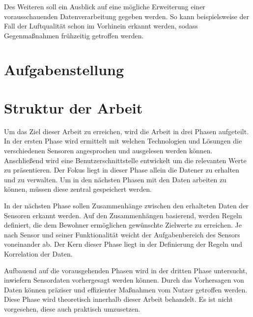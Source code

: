 Des Weiteren soll ein Ausblick auf eine mögliche Erweiterung einer vorausschauenden Datenverarbeitung gegeben werden. So kann beispielsweise der Fall der Luftqualität schon im Vorhinein erkannt werden, sodass Gegenmaßnahmen frühzeitig getroffen werden.
\section{Aufgabenstellung}
\section{Struktur der Arbeit}
Um das Ziel dieser Arbeit zu erreichen, wird die Arbeit in drei Phasen aufgeteilt. In der ersten Phase wird ermittelt mit welchen Technologien und Lösungen die verschiedenen Sensoren angesprochen und ausgelesen werden können. Anschließend wird eine Benutzerschnittstelle entwickelt um die relevanten Werte zu präsentieren. Der Fokus liegt in dieser Phase allein die Datener zu erhalten und zu verwalten. Um in den nächsten Phasen mit den Daten arbeiten zu können, müssen diese zentral gespeichert werden.

In der nächsten Phase sollen Zusammenhänge zwischen den erhalteten Daten der Sensoren erkannt werden. Auf den Zusammenhängen basierend, werden Regeln definiert, die dem Bewohner ermöglichen gewünschte Zielwerte zu erreichen. Je nach Sensor und seiner Funktionalität weicht der Aufgabenbereich des Sensors voneinander ab. Der Kern dieser Phase liegt in der Definierung der Regeln und Korrelation der Daten.

Aufbauend auf die vorausgehenden Phasen wird in der dritten Phase untersucht, inwiefern Sensordaten vorhergesagt werden können. Durch das Vorhersagen von Daten können präziser und effizienter Maßnahmen vom Nutzer getroffen werden. Diese Phase wird theoretisch innerhalb dieser Arbeit behandelt. Es ist nicht vorgesehen, diese auch praktisch umzusetzen.